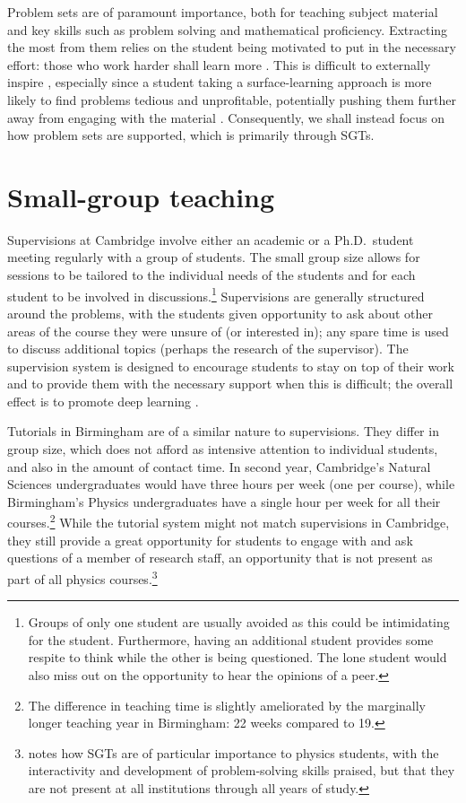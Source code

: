 Problem sets are of paramount importance, both for teaching subject material and key skills such as problem solving and mathematical proficiency. Extracting the most from them relies on the student being motivated to put in the necessary effort: those who work harder shall learn more \citep{Gibbs2015}. This is difficult to externally inspire \citep[cf.][]{Ryan2000}, especially since a student taking a surface-learning approach is more likely to find problems tedious and unprofitable, potentially pushing them further away from engaging with the material \citep[chapter 4]{Ramsden1992}. Consequently, we shall instead focus on how problem sets are supported, which is primarily through SGTs.

\section{Small-group teaching}\label{sec:small}

Supervisions at Cambridge involve either an academic or a Ph.D.\ student meeting regularly with a group of students. The small group size allows for sessions to be tailored to the individual needs of the students and for each student to be involved in discussions.\footnote{Groups of only one student are usually avoided as this could be intimidating for the student. Furthermore, having an additional student provides some respite to think while the other is being questioned. The lone student would also miss out on the opportunity to hear the opinions of a peer.} Supervisions are generally structured around the problems, with the students given opportunity to ask about other areas of the course they were unsure of (or interested in); any spare time is used to discuss additional topics (perhaps the research of the supervisor). The supervision system is designed to encourage students to stay on top of their work and to provide them with the necessary support when this is difficult; the overall effect is to promote deep learning \citep[case study 14.1]{Gibbs2015}.

Tutorials in Birmingham are of a similar nature to supervisions. They differ in group size, which does not afford as intensive attention to individual students, and also in the amount of contact time. In second year, Cambridge's Natural Sciences undergraduates would have three hours per week (one per course), while Birmingham's Physics undergraduates have a single hour per week for all their courses.\footnote{The difference in teaching time is slightly ameliorated by the marginally longer teaching year in Birmingham: 22 weeks compared to 19.} While the tutorial system might not match supervisions in Cambridge, they still provide a great opportunity for students to engage with and ask questions of a member of research staff, an opportunity that is not present as part of all physics courses.\footnote{\citet{Sharma2007} notes how SGTs are of particular importance to physics students, with the interactivity and development of problem-solving skills praised, but that they are not present at all institutions through all years of study.}

